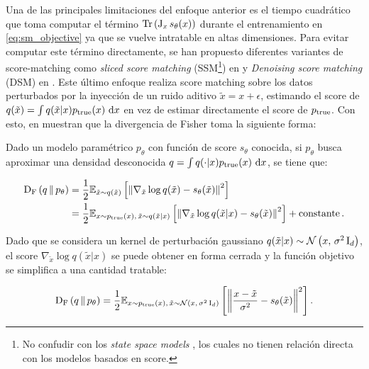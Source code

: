 Una de las principales limitaciones del enfoque anterior es el tiempo cuadrático que toma computar el término $\operatorname{Tr}\left(\operatorname{J}_x s_\theta(x)\right)$ durante el entrenamiento en \eqref{eq:sm_objective} ya que se vuelve intratable en altas dimensiones. Para evitar computar este término directamente, se han propuesto diferentes variantes de score-matching como \textit{sliced score matching} (SSM\footnote{No confudir con los \textit{state space models} \cite{gu2022efficientlymodelinglongsequences}, los cuales no tienen relación directa con los modelos basados en score.}) en \cite{song2019sliced} y \textit{Denoising score matching} (DSM) en \cite{DSM}. Este último enfoque realiza score matching sobre los datos perturbados por la inyección de un ruido aditivo $\tilde{x} = x+\epsilon$, estimando el score de $q(\tilde{x})=\int q(\tilde{x}|x)p_{\operatorname{true}}(x)\,\operatorname{d}\! x$ en vez de estimar directamente el score de $p_{\operatorname{true}}$. Con esto, en \cite{DSM} muestran que la divergencia de Fisher toma la siguiente forma:

\begin{prop}
    \label{prop:fisher_dsm}
    Dado un modelo paramétrico $p_\theta$ con función de score $s_\theta$ conocida, si $p_\theta$ busca aproximar una densidad desconocida $q=\int q(\cdot|x)p_{\operatorname{true}}(x)\,\operatorname{d}\! x$, se tiene que:

    \begin{align*}
        \operatorname{D_F}\left(q\,\|\,p_\theta\right) & = \frac{1}{2}\mathbb{E}_{\tilde{x}\sim q(\tilde{x})}\left[\left\lVert \nabla_{\tilde{x}}\log q(\tilde{x}) - s_\theta(\tilde{x}) \right\rVert^2\right]                             \\
                         & = \frac{1}{2}\mathbb{E}_{x\sim p_{\operatorname{true}}(x),\,\tilde{x}\sim q(\tilde{x}|x)}\left[\left\lVert \nabla_{\tilde{x}}\log q(\tilde{x}|x) - s_\theta(\tilde{x}) \right\rVert^2\right] + \operatorname{constante} .
    \end{align*}
\end{prop}

Dado que se considera un kernel de perturbación gaussiano $q(\tilde{x}|x) \sim \mathcal{N}\left(x,\,\sigma^2 \operatorname{I}_{d}\right)$, el score $\nabla_{\tilde{x}}\log q(\tilde{x}|x)$ se puede obtener en forma cerrada y la función objetivo se simplifica a una cantidad tratable:

\begin{equation}
    \label{eq:fisher_dsm}
    \operatorname{D_F}\left(q\,\|\,p_\theta\right) = \frac{1}{2}\mathbb{E}_{x\sim p_{\operatorname{true}}(x),\,\tilde{x}\sim \mathcal{N}\left(x,\,\sigma^2 \operatorname{I}_{d}\right)}\left[\left\lVert \frac{x-\tilde{x}}{\sigma^2} - s_\theta(\tilde{x}) \right\rVert^2\right] .
\end{equation}

